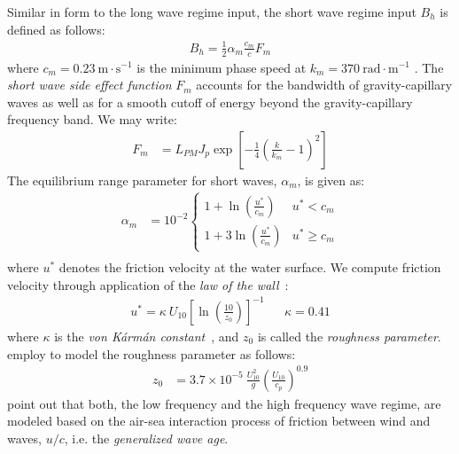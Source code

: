 Similar in form to the long wave regime input, the short wave regime input $B_h$
is defined as follows:
\begin{align*}
 B_h = \frac{1}{2}\alpha_m\frac{c_m}{c}F_m
\end{align*}
where ${c_m=0.23~\text{m}\cdot\text{s}^{-1}}$ is the minimum phase speed at
\wavenumber ${k_m=370~\text{rad}\cdot\text{m}^{-1}}$ \citep{lamb:1945}.
The \emph{short wave side effect function} $F_m$ accounts for the bandwidth of
gravity-capillary waves as well as for a smooth cutoff of energy beyond the
gravity-capillary frequency band. We may write:
\begin{align*}
 F_m &= L_{PM}J_p\exp\left[- 
\frac{1}{4}\left(\frac{k}{k_m} - 1\right)^2\right]
\end{align*}
The equilibrium range parameter for short waves, $\alpha_m$, is given as:
\begin{align*}
 \alpha_m &= 10^{-2}\begin{cases}
	1 + \ln\left(\frac{u^{\ast}}{c_m}\right) & u^{\ast} < c_m \\
	1 + 3\ln\left(\frac{u^{\ast}}{c_m}\right) & u^{\ast} \geq c_m
	\end{cases} \\
\end{align*}
where $u^{\ast}$ denotes the friction velocity at the water surface.
We compute friction velocity through application of the
\emph{law of the wall}~\citep{article:vonKarman1931}:
%
\begin{align*}
u^{\ast} = \kappa~U_{10} \left[\ln\left(\frac{10}{z_0}\right)\right]^{-1} && \kappa = 0.41
\end{align*}
where $\kappa$ is the \emph{von K\'arm\'an constant}~\citep{article:vonKarman1931},
and $z_0$ is called the \emph{roughness parameter}.
\citeauthor{article:Elfouhaily1997} employ \citet{article:Donelan1993} to model
the roughness parameter as follows:
\begin{align*}
z_0 &= 3.7 \times 10^{-5}~\frac{U_{10}^2}{g}
\left(\frac{U_{10}}{c_p}\right)^{0.9} \label{eq:z_0}
\end{align*}
%
\citeauthor{article:Elfouhaily1997} point out that both, the low frequency
and the high frequency wave regime, are modeled based on the air-sea
interaction process of friction between wind and
waves, $u/c$, i.e. the \emph{generalized wave age}.
%
%
